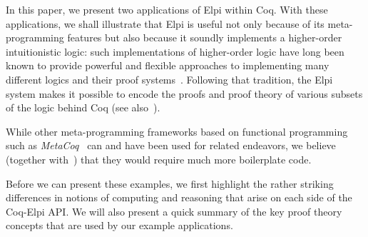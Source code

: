 In this paper, we present two applications of Elpi within Coq. With
these applications, we shall illustrate that Elpi is useful not only
because of its meta-programming features but also because it soundly
implements a higher-order intuitionistic logic: such implementations
of higher-order logic have long been known to provide powerful and
flexible approaches to implementing many different logics and their
proof systems~\cite{felty88cade,paulson89jar}.  Following
that tradition, the Elpi system makes it possible to encode the proofs
and proof theory of various subsets of the logic behind Coq 
(see also~\cite{felty93lics}). 

While other meta-programming frameworks based on functional
programming such as \emph{MetaCoq}~\cite{sozeau2020metacoq} can and
have been used for related endeavors, we believe (together
with~\cite{DunchevCT16}) that they would require much more
boilerplate code.

Before we can present these examples, we first highlight the rather
striking differences in notions of computing and reasoning that arise
on each side of the Coq-Elpi API.   We will also present a quick
summary of the key proof theory concepts that are used by our example
applications.


